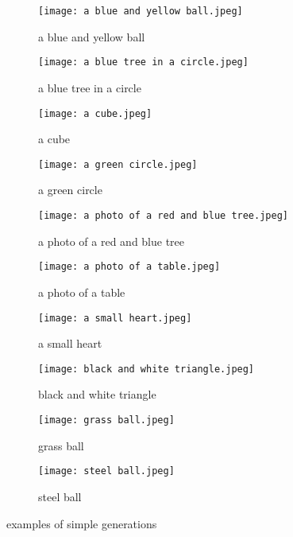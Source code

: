 \documentclass{article}
\begin{document}
\begin{appendix}
\begin{figure}[H]
\begin{subfigure}{.5\textwidth}
  \centering
  \texttt{[image: a blue and yellow ball.jpeg]}
  \caption{a blue and yellow ball}
  \label{fig:a blue and yellow ball.}
\end{subfigure}%
\begin{subfigure}{.5\textwidth}
  \centering
  \texttt{[image: a blue tree in a circle.jpeg]}
  \caption{a blue tree in a circle}
  \label{fig:a blue tree in a circle}
\end{subfigure}
\begin{subfigure}{.5\textwidth}
  \centering
  \texttt{[image: a cube.jpeg]}
  \caption{a cube}
  \label{fig:a cube}
\end{subfigure}
\begin{subfigure}{.5\textwidth}
  \centering
  \texttt{[image: a green circle.jpeg]}
  \caption{a green circle}
  \label{fig:a green circle}
\end{subfigure}
\begin{subfigure}{.5\textwidth}
  \centering
  \texttt{[image: a photo of a red and blue tree.jpeg]}
  \caption{a photo of a red and blue tree}
  \label{fig:a photo of a red and blue tree}
\end{subfigure}
\begin{subfigure}{.5\textwidth}
  \centering
  \texttt{[image: a photo of a table.jpeg]}
  \caption{a photo of a table}
  \label{fig:a photo of a table}
\end{subfigure}
\begin{subfigure}{.5\textwidth}
  \centering
  \texttt{[image: a small heart.jpeg]}
  \caption{a small heart}
  \label{fig:a small heart}
\end{subfigure}
\begin{subfigure}{.5\textwidth}
  \centering
  \texttt{[image: black and white triangle.jpeg]}
  \caption{black and white triangle}
  \label{fig:black and white triangle}
\end{subfigure}
\begin{subfigure}{.5\textwidth}
  \centering
  \texttt{[image: grass ball.jpeg]}
  \caption{grass ball}
  \label{fig:grass ball}
\end{subfigure}
\begin{subfigure}{.5\textwidth}
  \centering
  \texttt{[image: steel ball.jpeg]}
  \caption{steel ball}
  \label{fig:steel ball}
\end{subfigure}
\caption{examples of simple generations}
\label{fig:first_generations}
\end{figure}



\end{appendix}
\end{document}
